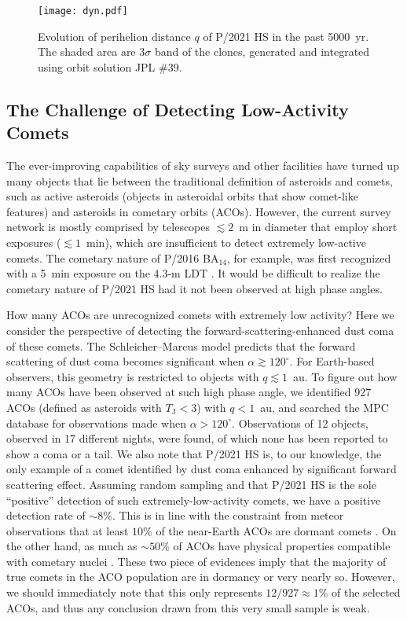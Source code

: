 \documentclass[modern]{aastex631}
\begin{document}
\begin{CJK*}{UTF8}{gbsn}
\begin{figure*}
\begin{center}
\texttt{[image: dyn.pdf]}
\caption{Evolution of perihelion distance $q$ of P/2021 HS in the past 5000~yr. The shaded area are $3\sigma$ band of the clones, generated and integrated using orbit solution JPL \#39.\label{fig:dyn}}
\end{center}
\end{figure*}

\subsection{The Challenge of Detecting Low-Activity Comets}

The ever-improving capabilities of sky surveys and other facilities have turned up many objects that lie between the traditional definition of asteroids and comets, such as active asteroids (objects in asteroidal orbits that show comet-like features) and asteroids in cometary orbits (ACOs). However, the current survey network is mostly comprised by telescopes $\lesssim2$~m in diameter that employ short exposures ($\lesssim1$~min), which are insufficient to detect extremely low-active comets. The cometary nature of P/2016 BA$_{14}$, for example, was first recognized with a 5~min exposure on the 4.3-m LDT \citep{Knight2016}. It would be difficult to realize the cometary nature of P/2021 HS had it not been observed at high phase angles. 

How many ACOs are unrecognized comets with extremely low activity? Here we consider the perspective of detecting the forward-scattering-enhanced dust coma of these comets. The Schleicher--Marcus model predicts that the forward scattering of dust coma becomes significant when $\alpha \gtrsim 120^\circ$. For Earth-based observers, this geometry is restricted to objects with $q\lesssim1$~au. To figure out how many ACOs have been observed at such high phase angle, we identified 927 ACOs (defined as asteroids with $T_\mathrm{J}<3$) with $q<1$~au, and searched the MPC database for observations made when $\alpha>120^\circ$. Observations of 12 objects, observed in 17 different nights, were found, of which none has been reported to show a coma or a tail. We also note that P/2021 HS is, to our knowledge, the only example of a comet identified by dust coma enhanced by significant forward scattering effect. Assuming random sampling and that P/2021 HS is the sole ``positive'' detection of such extremely-low-activity comets, we have a positive detection rate of $\sim8\%$. This is in line with the constraint from meteor observations that at least $10\%$ of the near-Earth ACOs are dormant comets \citep{Ye2016a}. On the other hand, as much as $\sim50\%$ of ACOs have physical properties compatible with cometary nuclei \citep{Mommert2015, Mommert2020}. These two piece of evidences imply that the majority of true comets in the ACO population are in dormancy or very nearly so. However, we should immediately note that this only represents $12/927\approx1\%$ of the selected ACOs, and thus any conclusion drawn from this very small sample is weak.


\end{CJK*}
\end{document}
